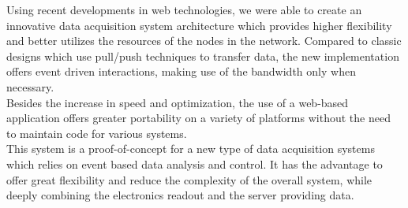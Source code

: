     Using recent developments in web technologies, we were able to create an innovative data acquisition system architecture which provides higher flexibility and better utilizes the resources of the nodes in the network. Compared to classic designs which use pull/push techniques to transfer data, the new implementation offers event driven interactions, making use of the bandwidth only when necessary. \\

    Besides the increase in speed and optimization, the use of a web-based application offers greater portability on a variety of platforms without the need to maintain code for various systems. \\

    This system is a proof-of-concept for a new type of data acquisition systems which relies on event based data analysis and control. It has the advantage to offer great flexibility and reduce the complexity of the overall system, while deeply combining the electronics readout and the server providing data.
